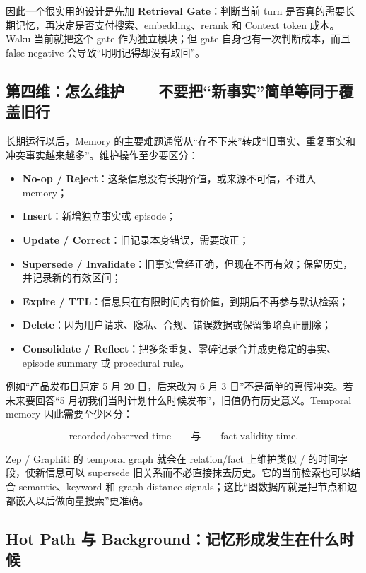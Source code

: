 \documentclass[profile=standard,twoside=false]{ipara-handbook}
\begin{document}
因此一个很实用的设计是先加 \textbf{Retrieval Gate}：判断当前 turn 是否真的需要长期记忆，再决定是否支付搜索、embedding、rerank 和 Context token 成本。Waku 当前就把这个 gate 作为独立模块；但 gate 自身也有一次判断成本，而且 false negative 会导致“明明记得却没有取回”。

\subsection{第四维：怎么维护——不要把“新事实”简单等同于覆盖旧行}

长期运行以后，Memory 的主要难题通常从“存不下来”转成“旧事实、重复事实和冲突事实越来越多”。维护操作至少要区分：

\begin{itemize}
  \item \textbf{No-op / Reject}：这条信息没有长期价值，或来源不可信，不进入 memory；
  \item \textbf{Insert}：新增独立事实或 episode；
  \item \textbf{Update / Correct}：旧记录本身错误，需要改正；
  \item \textbf{Supersede / Invalidate}：旧事实曾经正确，但现在不再有效；保留历史，并记录新的有效区间；
  \item \textbf{Expire / TTL}：信息只在有限时间内有价值，到期后不再参与默认检索；
  \item \textbf{Delete}：因为用户请求、隐私、合规、错误数据或保留策略真正删除；
  \item \textbf{Consolidate / Reflect}：把多条重复、零碎记录合并成更稳定的事实、episode summary 或 procedural rule。
\end{itemize}

例如“产品发布日原定 5 月 20 日，后来改为 6 月 3 日”不是简单的真假冲突。若未来要回答“5 月初我们当时计划什么时候发布”，旧值仍有历史意义。Temporal memory 因此需要至少区分：

$$
\text{recorded/observed time}
\qquad\text{与}\qquad
\text{fact validity time}.
$$

Zep / Graphiti 的 temporal graph 就会在 relation/fact 上维护类似  /  的时间字段，使新信息可以 supersede 旧关系而不必直接抹去历史。它的当前检索也可以结合 semantic、keyword 和 graph-distance signals；这比“图数据库就是把节点和边都嵌入以后做向量搜索”更准确。

\subsection{Hot Path 与 Background：记忆形成发生在什么时候}
\end{document}
